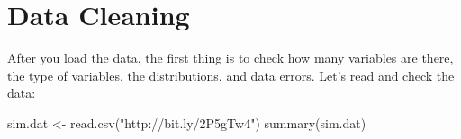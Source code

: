 \documentclass[
  12pt,
]{krantz}
\makeatletter
\newenvironment{Shaded}{\begin{snugshade}}{\end{snugshade}}
\newcommand{\FunctionTok}[1]{\textcolor[rgb]{0,0,0}{#1}}
\newcommand{\NormalTok}[1]{#1}
\newcommand{\OtherTok}[1]{\textcolor[rgb]{0.37,0.37,0.37}{#1}}
\newcommand{\StringTok}[1]{\textcolor[rgb]{0.5,0.5,0.5}{#1}}
\newenvironment{kframe}{%
\medskip{}
\setlength{\fboxsep}{.8em}
 \def\at@end@of@kframe{}%
 \ifinner\ifhmode%
  \def\at@end@of@kframe{\end{minipage}}%
  \begin{minipage}{\columnwidth}%
 \fi\fi%
 \def\FrameCommand##1{\hskip\@totalleftmargin \hskip-\fboxsep
 \colorbox{shadecolor}{##1}\hskip-\fboxsep
     \hskip-\linewidth \hskip-\@totalleftmargin \hskip\columnwidth}%
 \MakeFramed {\advance\hsize-\width
   \@totalleftmargin\z@ \linewidth\hsize
   \@setminipage}}%
 {\par\unskip\endMakeFramed%
 \at@end@of@kframe}
\renewenvironment{Shaded}{\begin{kframe}}{\end{kframe}}
\makeatother
\begin{document}
\hypertarget{data-cleaning}{%
\section{Data Cleaning}\label{data-cleaning}}

After you load the data, the first thing is to check how many variables are there, the type of variables, the distributions, and data errors. Let's read and check the data:

\begin{Shaded}
\begin{Highlighting}[]
\NormalTok{sim.dat }\OtherTok{\textless{}{-}} \FunctionTok{read.csv}\NormalTok{(}\StringTok{"http://bit.ly/2P5gTw4"}\NormalTok{)}
\FunctionTok{summary}\NormalTok{(sim.dat)}
\end{Highlighting}
\end{Shaded}
\end{document}
